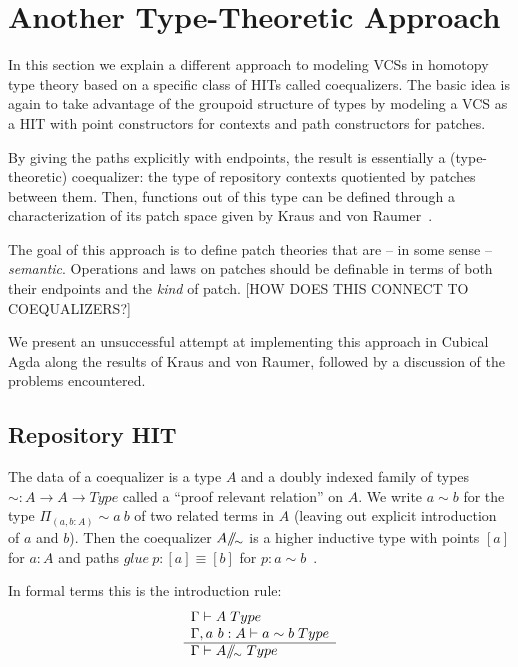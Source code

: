 \section{Another Type-Theoretic Approach}

In this section we explain a different approach to modeling VCSs in homotopy
type theory based on a specific class of HITs called coequalizers. The basic
idea is again to take advantage of the groupoid structure of types by modeling a
VCS as a HIT with point constructors for contexts and path constructors for
patches.

By giving the paths explicitly with endpoints, the result is essentially a
(type-theoretic) coequalizer: the type of repository contexts quotiented by
patches between them. Then, functions out of this type can be defined through a
characterization of its patch space given by Kraus and von Raumer~\cite{kraus2019path}.

The goal of this approach is to define patch theories that are -- in some sense
-- \emph{semantic}. Operations and laws on patches should be definable in terms
of both their endpoints and the \emph{kind} of patch. [HOW DOES THIS CONNECT TO
COEQUALIZERS?]

We present an unsuccessful attempt at implementing this approach in Cubical Agda
along the results of Kraus and von Raumer, followed by a discussion of the
problems encountered.

\subsection{Repository HIT}

The data of a coequalizer is a type $A$ and a doubly indexed family of types $\sim : A
\rightarrow A \rightarrow Type$ called a ``proof relevant relation'' on $A$. We
write $a \sim b$ for the type $\Pi_{(a,b : A)} \sim a~b$ of two related terms in
$A$ (leaving out explicit introduction of $a$ and $b$).
Then the coequalizer $A /\!\!/\!_{\sim}$ is a higher inductive type with points $[a]$ for
$a : A$ and paths $glue~p : [a] \equiv [b]$ for $p : a \sim b$~\cite{kraus2019path}.

In formal terms this is the introduction rule:
\begin{equation}
  \label{eq:coequalizer-intro}
  \begin{array}[t]{l}
    \Gamma \vdash A \; Type\\
    \Gamma, a~b : A \vdash a \sim b \; Type\\
    \hline
    \Gamma \vdash A /\!\!/\!_{\sim} \; Type\\
  \end{array}
\end{equation}

